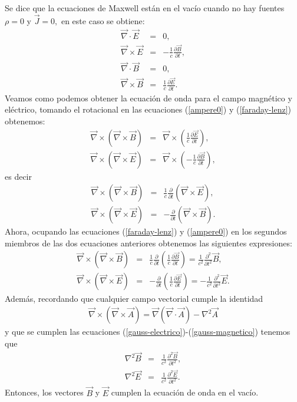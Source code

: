 \documentclass[letterpaper,12pt,oneside]{book}
\begin{document}
Se dice que la ecuaciones de Maxwell est\'an en el vac\'io cuando  no hay fuentes $\rho = 0$ y $\vec J = 0,$ en este caso se obtiene: 
%
\begin{eqnarray}
\vec \nabla \cdot \vec E &=& 0 \label{gauss-electrico},\\
\vec \nabla \times \vec E &=& -\frac{1}{c}\frac{\partial \vec B}{\partial t} ,\label{faraday-lenz}\\
\vec \nabla \cdot \vec B &=& 0 \label{gauss-magnetico},\\
\vec \nabla \times \vec B &=& \frac{1}{c}\frac{\partial \vec E}{\partial t}.\label{ampere0} 
\end{eqnarray}
%
Veamos como podemos obtener la ecuaci\'on de onda para el campo magn\'etico y el\'ectrico, tomando el rotacional en las ecuaciones (\ref{ampere0}) y (\ref{faraday-lenz}) obtenemos: 
%
\begin{eqnarray}
\vec \nabla \times (\vec \nabla \times \vec{B}) &=& \vec \nabla \times \left(\frac{1}{c}\frac{\partial \vec E}{\partial t}\right),\\
\vec \nabla \times (\vec \nabla \times \vec{E}) &=& \vec \nabla \times \left(-\frac{1}{c}\frac{\partial \vec B}{\partial t} \right),
\end{eqnarray}
%
es decir
%
\begin{eqnarray}
\vec \nabla \times (\vec \nabla \times \vec{B}) &=& \frac{1}{c}\frac{\partial }{\partial t} \left(\vec \nabla \times \vec E \right),\\
\vec \nabla \times (\vec \nabla \times \vec{E}) &=& -\frac{\partial }{\partial t} \left(\vec \nabla   \times \vec B \right).
\end{eqnarray}
%
Ahora, ocupando las ecuaciones (\ref{faraday-lenz}) y (\ref{ampere0}) en los segundos miembros de las dos ecuaciones anteriores  obtenemos las siguientes expresiones:
%
\begin{eqnarray}
\vec \nabla \times (\vec \nabla \times \vec{B}) &=& \frac{1}{c}\frac{\partial }{\partial t} \left(\frac{1}{c}\frac{\partial \vec B}{\partial t} \right)
= \frac{1}{c^{2}}\frac{\partial^{2} }{\partial t^{2}}  \vec B, \\
\vec \nabla \times (\vec \nabla \times \vec{E}) &=& -\frac{\partial }{\partial t} \left( \frac{1}{c}\frac{\partial \vec E}{\partial t} \right)= 
-\frac{1}{c^{2}}\frac{\partial^{2} }{\partial t^{2}}  \vec E.
\end{eqnarray}
%
Adem\'as,  recordando que cualquier campo vectorial cumple la identidad 
%
\begin{eqnarray}
\vec \nabla \times (\vec \nabla \times \vec{A}) = \vec \nabla(\vec \nabla \cdot \vec{A}) - \nabla^{2}\vec{A} \label{i1}
\end{eqnarray}
%
y que se cumplen las ecuaciones (\ref{gauss-electrico})-(\ref{gauss-magnetico}) tenemos  que
%
\begin{eqnarray}
\nabla^{2} \vec{B}& =& \frac{1}{c^2}\frac{\partial^2 \vec{B}}{\partial t^2}\label{ondaB} ,\\
\nabla^{2} \vec{E} &=& \frac{1}{c^2}\frac{\partial^2 \vec{E}}{\partial t^2}\label{ondaE}. 
\end{eqnarray}
%
Entonces, los vectores $\vec{B}$ y $\vec{E}$ cumplen la ecuaci\'on de onda en el vac\'io. \cite{WG}\\
%
\end{document}
